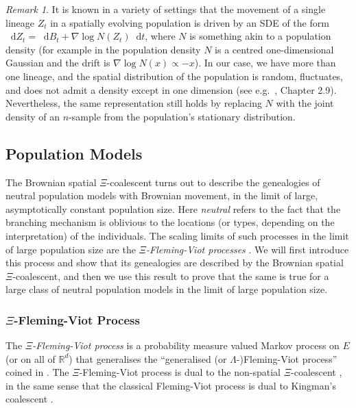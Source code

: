 \documentclass[reqno,draft]{amsart}
\numberwithin{equation}{section}
\theoremstyle{plain}
\theoremstyle{remark}
\newtheorem{remark}[theorem]{Remark}
\newcommand{\R}{\mathbb{R}} %
\newcommand*\diff{\mathop{}\!\mathrm{d}}
\begin{document}
\begin{remark}
    It is known in a variety of settings that the movement of a single lineage $Z_t$ in a spatially evolving population is driven by an SDE of the form $\diff Z_t = \diff B_t + \nabla \log N(Z_t) \diff t$, where $N$ is something akin to a population density (for example in \cite{sylviedynamics} the population density $N$ is a centred one-dimensional Gaussian and the drift is $\nabla \log N (x) \propto -x$). In our case, we have more than one lineage, and the spatial distribution of the population is random, fluctuates, and does not admit a density except in one dimension (see e.g.\ \cite{etheridgesuperprocesses}, Chapter 2.9).
    Nevertheless, the same representation still holds by replacing $N$ with the joint density of an $n$-sample from the population's stationary distribution.
\end{remark}

\subsection{Population Models}\label{sec:populationmodelsintro}
The Brownian spatial $\Xi$-coalescent turns out to describe the genealogies of neutral population models with Brownian movement, in the limit of large, asymptotically constant population size. Here \emph{neutral} refers to the fact that the branching mechanism is oblivious to the locations (or types, depending on the interpretation) of the individuals. The scaling limits of such processes in the limit of large population size are the \emph{$\Xi$-Fleming-Viot processes} \cite{xiflemingviot,DK96,DK99}. We will first introduce this process and show that its genealogies are described by the Brownian spatial $\Xi$-coalescent, and then we use this result to prove that the same is true for a large class of neutral population models in the limit of large population size.

\subsubsection{$\Xi$-Fleming-Viot Process}\label{sec:xiflemingviot}
The \emph{$\Xi$-Fleming-Viot process} \cite{xiflemingviot} is a probability measure valued Markov process on $E$ (or on all of $\R^d$) that generalises the ``generalised (or $\Lambda$-)Fleming-Viot process'' coined in \cite{BL2003}. The $\Xi$-Fleming-Viot process is dual to the non-spatial $\Xi$-coalescent \cite{xiflemingviot}, in the same sense that the classical Fleming-Viot process is dual to Kingman's coalescent \cite{DK96}. %
\end{document}
